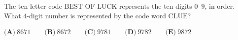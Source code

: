 The ten-letter code $\text{BEST OF LUCK}$ represents the ten digits $0$--$9$, in order. What $4$-digit number is represented by the code word $\text{CLUE}$?

$\textbf{(A)}\ 8671 \qquad \textbf{(B)}\ 8672 \qquad \textbf{(C)}\ 9781 \qquad \textbf{(D)}\ 9782 \qquad \textbf{(E)}\ 9872$
